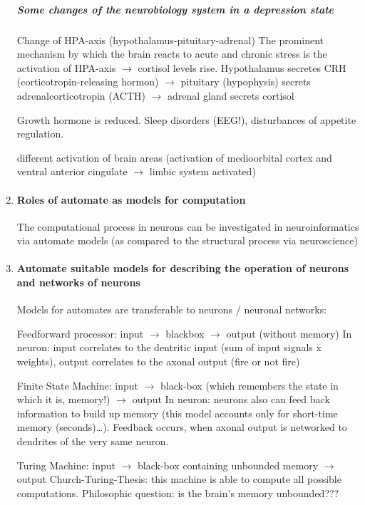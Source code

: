\documentclass[12pt,article,oneside,a4paper]{memoir}
\begin{document}
\begin{enumerate}
\subparagraph{Some changes of the neurobiology system in a depression state}
Change of HPA-axis (hypothalamus-pituitary-adrenal)
	The prominent mechanism by which the brain reacts to acute and chronic stress is the activation of HPA-axis $\rightarrow$ cortisol levels rise.
		Hypothalamus secretes CRH (corticotropin-releasing hormon) $\rightarrow$ pituitary (hypophysis) secrets adrenalcorticotropin (ACTH) $\rightarrow$ adrenal gland secrets cortisol

Growth hormone is reduced.
	Sleep disorders (EEG!), disturbances of appetite regulation.

different activation of brain areas (activation of medioorbital cortex and ventral anterior cingulate $\rightarrow$ limbic system activated)

\item \paragraph{Roles of automate as models for computation}

The computational process in neurons can be investigated in neuroinformatics via   automate models (as   compared to the structural process via neuroscience)

\item \paragraph{Automate suitable models for describing the operation of neurons and networks of neurons}

Models for automates are transferable to neurons / neuronal networks:

	Feedforward processor: input $\rightarrow$ blackbox $\rightarrow$ output (without memory)
	In neuron: input correlates to the dentritic input (sum of input signals x weights), output correlates to the axonal output (fire or not fire)

	Finite State Machine: input $\rightarrow$ black-box (which remembers the state in which it is, memory!) $\rightarrow$ output
	In neuron: neurons also can feed back information to build up memory (this model accounts only for short-time memory (seconds)…). Feedback occurs, when axonal output is networked to dendrites of the very same neuron.

	Turing Machine: input $\rightarrow$ black-box containing unbounded memory $\rightarrow$ output
	Church-Turing-Thesis: this machine is able to compute all possible computations. Philosophic question: is the brain’s memory unbounded???
	

\end{enumerate}
\end{document}
